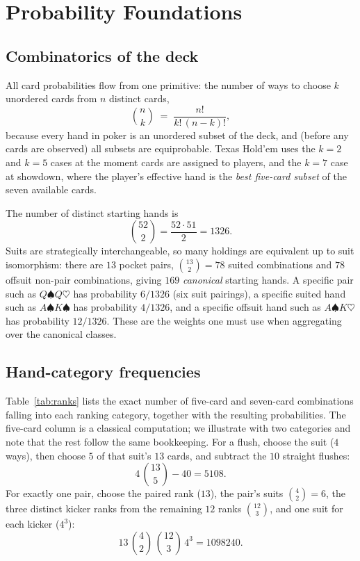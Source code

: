 \section{Probability Foundations}\label{sec:probability}

\subsection{Combinatorics of the deck}

All card probabilities flow from one primitive: the number of ways to choose $k$ unordered cards from $n$ distinct cards,
\begin{equation}\label{eq:binom}
\binom{n}{k} \;=\; \frac{n!}{k!\,(n-k)!},
\end{equation}
because every hand in poker is an unordered subset of the deck, and (before any cards are observed) all subsets are equiprobable. Texas Hold'em uses the $k=2$ and $k=5$ cases at the moment cards are assigned to players, and the $k=7$ case at showdown, where the player's effective hand is the \emph{best five-card subset} of the seven available cards.

The number of distinct starting hands is
\begin{equation}
\binom{52}{2} = \frac{52 \cdot 51}{2} = 1326 .
\end{equation}
Suits are strategically interchangeable, so many holdings are equivalent up to suit isomorphism: there are $13$ pocket pairs, $\binom{13}{2}=78$ suited combinations and $78$ offsuit non-pair combinations, giving $169$ \emph{canonical} starting hands. A specific pair such as $Q\spadesuit Q\heartsuit$ has probability $6/1326$ (six suit pairings), a specific suited hand such as $A\spadesuit K\spadesuit$ has probability $4/1326$, and a specific offsuit hand such as $A\spadesuit K\heartsuit$ has probability $12/1326$. These are the weights one must use when aggregating over the canonical classes.

\subsection{Hand-category frequencies}

Table~\ref{tab:ranks} lists the exact number of five-card and seven-card combinations falling into each ranking category, together with the resulting probabilities. The five-card column is a classical computation; we illustrate with two categories and note that the rest follow the same bookkeeping. For a flush, choose the suit ($4$ ways), then choose $5$ of that suit's $13$ cards, and subtract the $10$ straight flushes:
\begin{equation}
4\,\binom{13}{5} - 40 = 5108 .
\end{equation}
For exactly one pair, choose the paired rank ($13$), the pair's suits $\binom{4}{2}=6$, the three distinct kicker ranks from the remaining $12$ ranks $\binom{12}{3}$, and one suit for each kicker ($4^3$):
\begin{equation}
13\,\binom{4}{2}\,\binom{12}{3}\,4^3 = 1098240 .
\end{equation}

